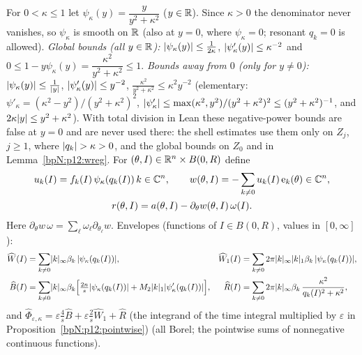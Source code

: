 \begin{definition}\label{bpN:p12:corrector}
For $0<\kappa\le1$ let $\psi_\kappa(y)=\dfrac y{y^2+\kappa^2}$ ($y\in\mathbb{R}$). Since $\kappa>0$ the denominator never vanishes, so $\psi_\kappa$ is smooth on $\mathbb{R}$ (also at $y=0$, where $\psi_\kappa=0$; resonant $q_k=0$ is allowed). \emph{Global bounds (all $y\in\mathbb{R}$):} $\lvert \psi_\kappa(y)\rvert\le\frac1{2\kappa}$, $\lvert \psi_\kappa'(y)\rvert\le\kappa^{-2}$ and $0\le1-y\psi_\kappa(y)=\dfrac{\kappa^2}{y^2+\kappa^2}\le1$. \emph{Bounds away from $0$ (only for $y\ne0$):} $\lvert \psi_\kappa(y)\rvert\le\frac1{\lvert y\rvert}$, $\lvert \psi_\kappa'(y)\rvert\le y^{-2}$, $\frac{\kappa^2}{y^2+\kappa^2}\le\kappa^2y^{-2}$ (elementary: $\psi'_\kappa=(\kappa^2-y^2)/(y^2+\kappa^2)^2$, $\lvert \psi'_\kappa\rvert\le\max(\kappa^2,y^2)/(y^2+\kappa^2)^2\le(y^2+\kappa^2)^{-1}$, and $2\kappa\lvert y\rvert\le y^2+\kappa^2$). With total division in Lean these negative-power bounds are false at $y=0$ and are never used there: the shell estimates use them only on $Z_j$, $j\ge1$, where $\lvert q_k\rvert>\kappa>0$, and the global bounds on $Z_0$ and in Lemma~\ref{bpN:p12:wreg}. For $(\theta,I)\in\mathbb{R}^n\times B(0,R)$ define
\begin{gather*}u_k(I)=f_k(I)\,\psi_\kappa(q_k(I))\,k\in\mathbb{C}^n,\qquad w(\theta,I)=-\sum_{k\ne0}u_k(I)\,\mathrm e_{k}(\theta)\in\mathbb{C}^n,\\ r(\theta,I)=a(\theta,I)-\partial_\theta w(\theta,I)\,\omega(I).\end{gather*}
Here $\partial_\theta w\,\omega=\sum_\ell\omega_\ell\partial_{\theta_\ell}w$. Envelopes (functions of $I\in B(0,R)$, values in $[0,\infty]$):
\begin{align*}
\widehat W(I)&=\sum_{k\ne0}\lvert k\rvert_\infty\beta_k\,\lvert \psi_\kappa(q_k(I))\rvert,&
\widehat W_1(I)&=\sum_{k\ne0}2\pi\lvert k\rvert_\infty\lvert k\rvert_1\beta_k\,\lvert \psi_\kappa(q_k(I))\rvert,\\
\widehat B(I)&=\sum_{k\ne0}\lvert k\rvert_\infty\beta_k\Bigl[\tfrac{2n}s\lvert \psi_\kappa(q_k(I))\rvert+M_2\lvert k\rvert_1\lvert \psi'_\kappa(q_k(I))\rvert\Bigr],&
\widehat R(I)&=\sum_{k\ne0}2\pi\lvert k\rvert_\infty\beta_k\,\frac{\kappa^2}{q_k(I)^2+\kappa^2},
\end{align*}
and $\widehat\Phi_{\varepsilon,\kappa}=\varepsilon\frac4s\widehat B+\varepsilon\frac2s\widehat W_1+\widehat R$ (the integrand of the time integral multiplied by $\varepsilon$ in Proposition~\ref{bpN:p12:pointwise}) (all Borel; the pointwise sums of nonnegative continuous functions).
\end{definition}


